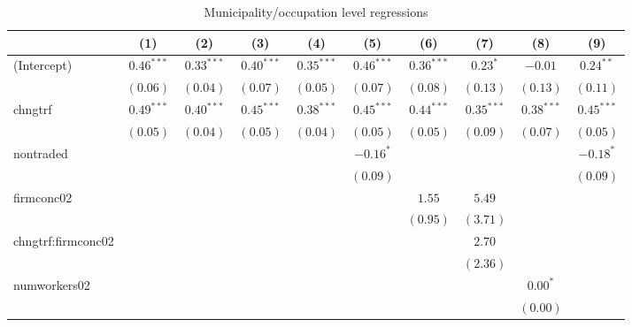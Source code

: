 
\begin{table}
\caption{Municipality/occupation level regressions}
\begin{center}
\begin{tabular}{l c c c c c c c c c }
\hline
 & (1) & (2) & (3) & (4) & (5) & (6) & (7) & (8) & (9) \\
\hline
(Intercept)          & $0.46^{***}$ & $0.33^{***}$ & $0.40^{***}$ & $0.35^{***}$ & $0.46^{***}$ & $0.36^{***}$ & $0.23^{*}$   & $-0.01$      & $0.24^{**}$  \\
                     & $(0.06)$     & $(0.04)$     & $(0.07)$     & $(0.05)$     & $(0.07)$     & $(0.08)$     & $(0.13)$     & $(0.13)$     & $(0.11)$     \\
chngtrf              & $0.49^{***}$ & $0.40^{***}$ & $0.45^{***}$ & $0.38^{***}$ & $0.45^{***}$ & $0.44^{***}$ & $0.35^{***}$ & $0.38^{***}$ & $0.45^{***}$ \\
                     & $(0.05)$     & $(0.04)$     & $(0.05)$     & $(0.04)$     & $(0.05)$     & $(0.05)$     & $(0.09)$     & $(0.07)$     & $(0.05)$     \\
nontraded            &              &              &              &              & $-0.16^{*}$  &              &              &              & $-0.18^{*}$  \\
                     &              &              &              &              & $(0.09)$     &              &              &              & $(0.09)$     \\
firmconc02           &              &              &              &              &              & $1.55$       & $5.49$       &              &              \\
                     &              &              &              &              &              & $(0.95)$     & $(3.71)$     &              &              \\
chngtrf:firmconc02   &              &              &              &              &              &              & $2.70$       &              &              \\
                     &              &              &              &              &              &              & $(2.36)$     &              &              \\
numworkers02         &              &              &              &              &              &              &              & $0.00^{*}$   &              \\
                     &              &              &              &              &              &              &              & $(0.00)$     &              \\

\end{tabular}
\end{center}
\end{table}
